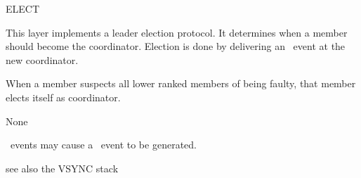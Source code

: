 %
%
%
\begin{Layer}{ELECT}

This layer implements a leader election protocol.  It determines when a member
should become the coordinator.  Election is done by delivering an \DnElect\
event at the new coordinator.

\begin{Protocol}
When a member suspects all lower ranked members of being faulty, that member elects
itself as coordinator.
\end{Protocol}

\begin{Parameters}
\item None
\end{Parameters}

\begin{Properties}
\item
\UpSuspect\ events may cause a \DnElect\ event to be generated.
\end{Properties}

\begin{Sources}
\end{Sources}

\begin{GenEvent}
\genevent{\DnElect}
\end{GenEvent}

\begin{Testing}
\item
see also the VSYNC stack
\end{Testing}
\end{Layer}

